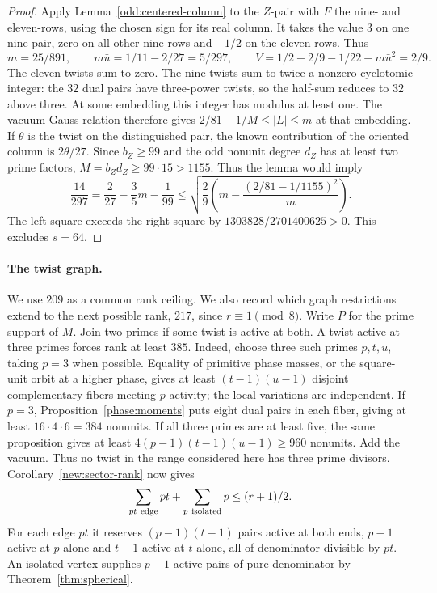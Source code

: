 \documentclass[11pt]{amsart}
\numberwithin{equation}{section}
\theoremstyle{definition}
\theoremstyle{plain}
\begin{document}
\begin{proof}
Apply Lemma~\ref{odd:centered-column} to the $Z$-pair with $F$
the nine- and eleven-rows, using the chosen sign for its real column.
It takes the value $3$ on one nine-pair, zero on all other nine-rows
and $-1/2$ on the eleven-rows. Thus
\[
 m=25/891,\qquad m\bar u=1/11-2/27=5/297,\qquad
 V=1/2-2/9-1/22-m\bar u^2=2/9.
\]
The eleven twists sum to zero. The nine twists sum to twice a
nonzero cyclotomic integer: the $32$ dual pairs have three-power
twists, so the half-sum reduces to $32$ above three.
At some embedding this integer has modulus at least one.
The vacuum Gauss relation therefore gives
$2/81-1/M\le |L|\le m$ at that embedding. If $\theta$ is the
twist on the distinguished pair, the known contribution of the
oriented column is $2\theta/27$. Since $b_Z\ge99$ and the odd nonunit degree $d_Z$ has at least
two prime factors, $M=b_Zd_Z\ge99\cdot15>1155$. Thus
the lemma would imply
\[
 \frac{14}{297}=\frac2{27}-\frac35m-\frac1{99}
 \le\sqrt{\frac29\left(m-\frac{(2/81-1/1155)^2}{m}\right)} .
\]
The left square exceeds the right square by
$1303828/2701400625>0$. This excludes $s=64$.
\end{proof}


\paragraph{The twist graph.}
We use $209$ as a common rank ceiling. We also record which graph restrictions extend to the next possible rank, $217$, since $r\equiv1\pmod8$. Write $P$ for the prime support of $M$. Join two primes if some twist
is active at both. A twist active at three primes forces rank at
least $385$. Indeed, choose three such primes $p,t,u$, taking
$p=3$ when possible.
Equality of primitive phase masses, or the square-unit orbit at a
higher phase, gives at least $(t-1)(u-1)$ disjoint complementary
fibers meeting $p$-activity; the local variations are independent.
If $p=3$, Proposition~\ref{phase:moments} puts eight dual pairs
in each fiber, giving at least $16\cdot4\cdot6=384$ nonunits.
If all three primes are at least five, the same proposition gives
at least $4(p-1)(t-1)(u-1)\ge960$ nonunits. Add the vacuum.
Thus no twist in the range considered here has three prime divisors.
Corollary~\ref{new:sector-rank} now gives
\[
 \sum_{pt\ {\rm edge}}pt+\sum_{p\ {\rm isolated}}p\le (r+1)/2.
\]
For each edge $pt$ it reserves $(p-1)(t-1)$ pairs active at both
ends, $p-1$ active at $p$ alone and $t-1$ active at $t$ alone, all of
denominator divisible by $pt$. An isolated vertex supplies $p-1$
active pairs of pure denominator by Theorem~\ref{thm:spherical}.
\end{document}
